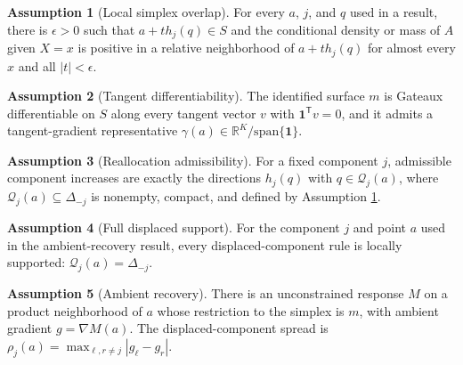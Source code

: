 \documentclass[11pt]{article}
\newcommand{\one}{\mathbf{1}}
\newcommand{\transpose}{\mathsf{T}}
\newcommand{\R}{\mathbb{R}}
\theoremstyle{definition}
\newtheorem{assumption}{Assumption}
\theoremstyle{plain}
\theoremstyle{remark}
\begin{document}
\begin{assumption}[Local simplex overlap]\label{ass:overlap}
For every \(a\), \(j\), and \(q\) used in a result, there is \(\epsilon>0\) such that \(a+t h_j(q)\in S\) and the conditional density or mass of \(A\) given \(X=x\) is positive in a relative neighborhood of \(a+t h_j(q)\) for almost every \(x\) and all \(|t|<\epsilon\).
\end{assumption}

\begin{assumption}[Tangent differentiability]\label{ass:differentiability}
The identified surface \(m\) is Gateaux differentiable on \(S\) along every tangent vector \(v\) with \(\one^\transpose v=0\), and it admits a tangent-gradient representative \(\gamma(a)\in\R^K/\mathrm{span}\{\one\}\).
\end{assumption}

\begin{assumption}[Reallocation admissibility]\label{ass:admissibility}
For a fixed component \(j\), admissible component increases are exactly the directions \(h_j(q)\) with \(q\in\mathcal{Q}_j(a)\), where \(\mathcal{Q}_j(a)\subseteq\Delta_{-j}\) is nonempty, compact, and defined by Assumption \ref{ass:overlap}.
\end{assumption}

\begin{assumption}[Full displaced support]\label{ass:fullsupport}
For the component \(j\) and point \(a\) used in the ambient-recovery result, every displaced-component rule is locally supported: \(\mathcal{Q}_j(a)=\Delta_{-j}\).
\end{assumption}

\begin{assumption}[Ambient recovery]\label{ass:ambient}
There is an unconstrained response \(M\) on a product neighborhood of \(a\) whose restriction to the simplex is \(m\), with ambient gradient \(g=\nabla M(a)\). The displaced-component spread is \(\rho_j(a)=\max_{\ell,r\neq j}|g_\ell-g_r|\).
\end{assumption}
\end{document}

